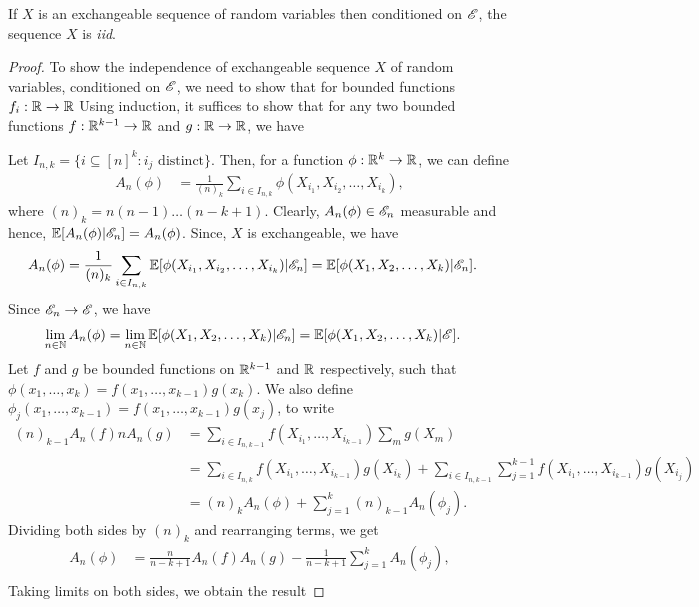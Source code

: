 \documentclass[a4paper,10pt,english]{article}
\begin{document}
\begin{thm} 
If $X$ is an exchangeable sequence of random variables then conditioned on $\mathscr{E}$, the sequence $X$ is \textit{iid}. 
\end{thm}
\begin{proof} 
To show the independence of exchangeable sequence $X$ of random variables, conditioned on $\mathscr{E}$, 
we need to show that for bounded functions $f_i: \mathbb{R} \to \mathbb{R}$
Using induction, it suffices to show that for any two bounded functions $f: \mathbb{R}^{k-1} \to \mathbb{R}$ and $g: \mathbb{R} \to \mathbb{R}$, we have 

Let $I_{n,k} = \{i \subseteq [n]^k: i_j \text{ distinct}\}$. 
Then, for a function $\phi: \mathbb{R}^k \to \mathbb{R}$, we can define
\begin{align*}
A_n(\phi) &= \frac{1}{(n)_k}\sum_{i \in I_{n,k}}\phi(X_{i_1}, X_{i_2}, \ldots, X_{i_k}),
\end{align*}
where $(n)_k = n(n-1)\ldots(n-k+1)$. Clearly, $A_n(\phi) \in \mathscr{E}_n$ measurable and hence,
$\mathbb{E}[A_n(\phi)|\mathscr{E}_n] = A_n(\phi)$. Since, $X$ is exchangeable, we have
\begin{align*}
A_n(\phi) &= \frac{1}{(n)_k}\sum_{i \in I_{n,k}}\mathbb{E}[\phi(X_{i_1}, X_{i_2}, \ldots, X_{i_k})|\mathscr{E}_n] = \mathbb{E}[\phi(X_{1}, X_{2}, \ldots, X_{k})|\mathscr{E}_n].
\end{align*}
Since $\mathscr{E}_n \to \mathscr{E}$, we have 
\begin{align*}
\lim_{n \in \mathbb{N}} A_n(\phi) &= \lim_{n \in \mathbb{N}} \mathbb{E}[\phi(X_{1}, X_{2}, \ldots, X_{k})|\mathscr{E}_n] = \mathbb{E}[\phi(X_{1}, X_{2}, \ldots, X_{k})|\mathscr{E}] .
\end{align*}
Let $f$ and $g$ be bounded functions on $\mathbb{R}^{k-1}$ and $\mathbb{R}$ respectively, such that $\phi(x_1,\ldots,x_k) = f(x_1,\ldots,x_{k-1})g(x_k)$. We also define $\phi_j(x_1,\ldots,x_{k-1}) = f(x_1,\ldots,x_{k-1})g(x_j)$, to write 
\begin{align*}
(n)_{k-1}A_n(f)nA_n(g) &= \sum_{i \in I_{n,k-1}}f(X_{i_1}, \ldots,X_{i_{k-1}})\sum_{m}g(X_{m})\\
&= \sum_{i \in I_{n,k}}f(X_{i_1}, \ldots,X_{i_{k-1}})g(X_{i_k}) + \sum_{i \in I_{n,k-1}}\sum_{j=1}^{k-1}f(X_{i_1},\ldots,X_{i_{k-1}})g(X_{i_j})\\
&= (n)_kA_n(\phi) + \sum_{j=1}^k(n)_{k-1}A_n(\phi_j).
\end{align*}
Dividing both sides by $(n)_k$ and rearranging terms, we get
\begin{align*}
A_n(\phi)& = \frac{n}{n-k+1}A_n(f)A_n(g) - \frac{1}{n-k+1}\sum_{j=1}^kA_n(\phi_j),\\
\end{align*}
Taking limits on both sides, we obtain the result
\end{proof}
\end{document}
